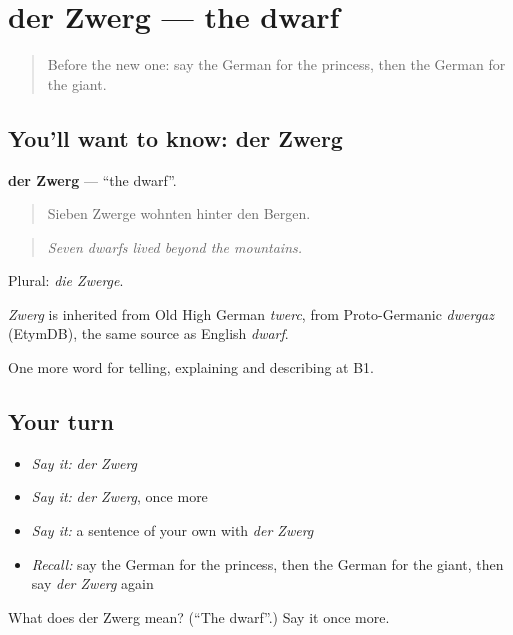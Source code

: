\section[der Zwerg]{der Zwerg — the dwarf}

\label{lesson:GE-C315-zwerg}



\begin{quote}
Before the new one: say the German for the princess, then the German for the giant.
\end{quote}

\subsection*{You'll want to know: der Zwerg}
\textbf{der Zwerg} — \textquotedblleft{}the dwarf\textquotedblright{}.

\begin{quote}
Sieben Zwerge wohnten hinter den Bergen.
\end{quote}

\begin{quote}
\emph{Seven dwarfs lived beyond the mountains.}
\end{quote}

Plural: \emph{die Zwerge}.

\begin{cousinweb}
\emph{Zwerg} is inherited from Old High German \emph{twerc}, from Proto-Germanic \emph{dwergaz} (EtymDB), the same source as English \emph{dwarf}.
\end{cousinweb}

\begin{grammarlens}[title={What you've built}]
One more word for telling, explaining and describing at B1.
\end{grammarlens}

\subsection*{Your turn}
\begin{itemize}
\raggedright
  \item \emph{Say it:} \emph{der Zwerg}
  \item \emph{Say it:} \emph{der Zwerg}, once more
  \item \emph{Say it:} a sentence of your own with \emph{der Zwerg}
  \item \emph{Recall:} say the German for the princess, then the German for the giant, then say \emph{der Zwerg} again
\end{itemize}

\begin{tcolorbox}[breakable,colback=teal!4,colframe=teal!35!black,title={Before you move on}]
What does der Zwerg mean? (\textquotedblleft{}The dwarf\textquotedblright{}.) Say it once more.
\end{tcolorbox}
